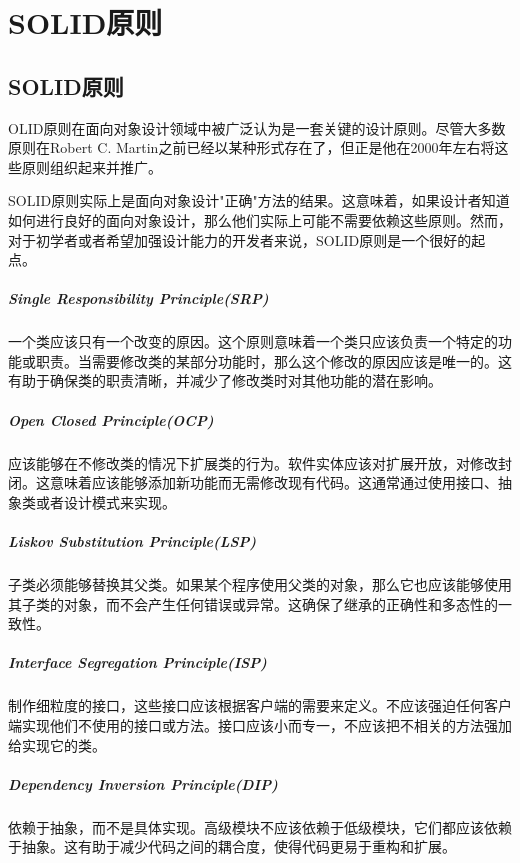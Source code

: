 \chapter{SOLID原则}


\section{SOLID原则}
OLID原则在面向对象设计领域中被广泛认为是一套关键的设计原则。尽管大多数原则在Robert C. Martin之前已经以某种形式存在了，但正是他在2000年左右将这些原则组织起来并推广。

SOLID原则实际上是面向对象设计"正确"方法的结果。这意味着，如果设计者知道如何进行良好的面向对象设计，那么他们实际上可能不需要依赖这些原则。然而，对于初学者或者希望加强设计能力的开发者来说，SOLID原则是一个很好的起点。

\paragraph{Single Responsibility Principle(SRP)}一个类应该只有一个改变的原因。这个原则意味着一个类只应该负责一个特定的功能或职责。当需要修改类的某部分功能时，那么这个修改的原因应该是唯一的。这有助于确保类的职责清晰，并减少了修改类时对其他功能的潜在影响。
\paragraph{Open Closed Principle(OCP)}应该能够在不修改类的情况下扩展类的行为。软件实体应该对扩展开放，对修改封闭。这意味着应该能够添加新功能而无需修改现有代码。这通常通过使用接口、抽象类或者设计模式来实现。
\paragraph{Liskov Substitution Principle(LSP)}子类必须能够替换其父类。如果某个程序使用父类的对象，那么它也应该能够使用其子类的对象，而不会产生任何错误或异常。这确保了继承的正确性和多态性的一致性。
\paragraph{Interface Segregation Principle(ISP)}制作细粒度的接口，这些接口应该根据客户端的需要来定义。不应该强迫任何客户端实现他们不使用的接口或方法。接口应该小而专一，不应该把不相关的方法强加给实现它的类。
\paragraph{Dependency Inversion Principle(DIP)}依赖于抽象，而不是具体实现。高级模块不应该依赖于低级模块，它们都应该依赖于抽象。这有助于减少代码之间的耦合度，使得代码更易于重构和扩展。

